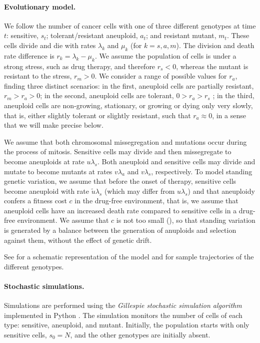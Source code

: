 \documentclass[12pt]{extarticle}
\renewcommand{\Delta}{r}
\begin{document}
\paragraph{Evolutionary model.}
We follow the number of cancer cells with one of three different genotypes at time $t$: sensitive, $s_t$; tolerant/resistant aneuploid, $a_t$; and resistant mutant, $m_t$. 
These cells divide and die with rates $\lambda_k$ and $\mu_k$ (for $k=s, a, m$).
The division and death rate difference is $\Delta_k = \lambda_k-\mu_k$.
We assume the population of cells is under a strong stress, such as drug therapy, and therefore $\Delta_s<0$, whereas the mutant is resistant to the stress, $\Delta_m>0$.
We consider a range of possible values for $\Delta_a$, finding three distinct scenarios: in the first, aneuploid cells are partially resistant, $\Delta_m>\Delta_a>0$; in the second, aneuploid cells are tolerant, $0>\Delta_a>\Delta_s$ \citep[see][for the distinction between susceptible, resistant, and tolerant]{brauner2016distinguishing}; in the third, aneuploid cells are non-growing, stationary, or growing or dying only very slowly, that is, either slightly tolerant or slightly resistant, such that $\Delta_a \approx 0$, in a sense that we will make precise below. 

We assume that both chromosomal missegregation and mutations occur during the process of mitosis. 
Sensitive cells may divide and then missegregate to become aneuploids at rate $u\lambda_s$.
Both aneuploid and sensitive cells may divide and mutate to become mutants at rates $v\lambda_{a}$ and $v\lambda_{s}$, respectively.
To model standing genetic variation, we assume that before the onset of therapy, sensitive cells become aneuploid with rate $\tilde{u}\lambda_s$ (which may differ from $u \lambda_s$) and that aneuploidy confers a fitness cost $c$ in the drug-free environment, that is, we assume that aneuploid cells have an increased death rate compared to sensitive cells in a drug-free environment. We assume that $c$ is not too small (), so that standing variation is generated by a balance between the generation of anuploids and selection against them, without the effect of genetic drift.

See  for a schematic representation of the model and  for sample trajectories of the different genotypes. 


\paragraph{Stochastic simulations.} 
Simulations are performed using the \emph{Gillespie stochastic simulation algorithm} \citep{gillespie1976general,gillespie1977exact} implemented in Python \citep{python}.
The simulation monitors the number of cells of each type: sensitive, aneuploid, and mutant. 
Initially, the population starts with only sensitive cells, $s_0=N$, and the other genotypes are initially absent.
\end{document}
